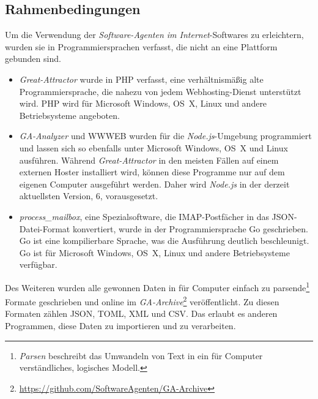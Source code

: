 \subsection{Rahmenbedingungen}
\label{sub:forschung_rahmenbedingungen}

Um die Verwendung der \emph{Software-Agenten im Internet}-Softwares zu
erleichtern, wurden sie in Programmiersprachen verfasst, die nicht an eine
Plattform gebunden sind.

\begin{itemize}
\item
  \emph{Great-Attractor} wurde in PHP verfasst, eine verhältnismäßig alte
  Programmiersprache, die nahezu von jedem Webhosting-Dienst unterstützt wird.
  PHP wird für Microsoft Windows, OS~X, Linux und andere Betriebsysteme
  angeboten.
\item
  \emph{GA-Analyzer} und WWWEB wurden für die \emph{Node.js}-Umgebung
  programmiert und lassen sich so ebenfalls unter Microsoft Windows, OS~X und
  Linux ausführen. Während \emph{Great-Attractor} in den meisten Fällen auf
  einem externen Hoster installiert wird, können diese Programme nur auf dem
  eigenen Computer ausgeführt werden. Daher wird \emph{Node.js} in der derzeit
  aktuellsten Version, 6, vorausgesetzt.
\item
  \emph{process\_mailbox}, eine Spezialsoftware, die IMAP-Postfächer in das
  JSON-Datei-Format konvertiert, wurde in der Programmiersprache Go
  geschrieben. Go ist eine kompilierbare Sprache, was die Ausführung deutlich
  beschleunigt. Go ist für Microsoft Windows, OS~X, Linux und andere
  Betriebsysteme verfügbar.
\end{itemize}

Des Weiteren wurden alle gewonnen Daten in für Computer einfach zu
parsende\footnote{\emph{Parsen} beschreibt das Umwandeln von Text in ein für
Computer verständliches, logisches Modell.} Formate geschrieben und online im
\emph{GA-Archive}\footnote{\url{https://github.com/SoftwareAgenten/GA-Archive}}
veröffentlicht. Zu diesen Formaten zählen JSON, TOML, XML und CSV. Das erlaubt
es anderen Programmen, diese Daten zu importieren und zu verarbeiten.
